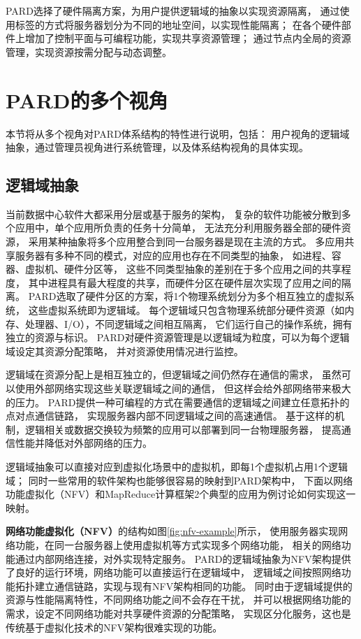 PARD选择了硬件隔离方案，为用户提供逻辑域的抽象以实现资源隔离，
通过使用标签的方式将服务器划分为不同的地址空间，以实现性能隔离；
在各个硬件部件上增加了控制平面与可编程功能，实现共享资源管理；
通过节点内全局的资源管理，实现资源按需分配与动态调整。


\section{PARD的多个视角}

本节将从多个视角对PARD体系结构的特性进行说明，包括：
用户视角的逻辑域抽象，通过管理员视角进行系统管理，以及体系结构视角的具体实现。

\subsection{逻辑域抽象}

当前数据中心软件大都采用分层或基于服务的架构，
复杂的软件功能被分散到多个应用中，单个应用所负责的任务十分简单，
无法充分利用服务器全部的硬件资源，
采用某种抽象将多个应用整合到同一台服务器是现在主流的方式。
多应用共享服务器有多种不同的模式，对应的应用也存在不同类型的抽象，
如进程、容器、虚拟机、硬件分区\cite{LDom,IBM_LPAR:2007}等，
这些不同类型抽象的差别在于多个应用之间的共享程度，
其中进程具有最大程度的共享，而硬件分区在硬件层次实现了应用之间的隔离。
PARD选取了硬件分区的方案，将1个物理系统划分为多个相互独立的虚拟系统，
这些虚拟系统即为逻辑域。
每个逻辑域只包含物理系统部分硬件资源（如内存、处理器、I/O），不同逻辑域之间相互隔离，
它们运行自己的操作系统，拥有独立的资源与标识。
PARD对硬件资源管理是以逻辑域为粒度，可以为每个逻辑域设定其资源分配策略，
并对资源使用情况进行监控。

逻辑域在资源分配上是相互独立的，但逻辑域之间仍然存在通信的需求，
虽然可以使用外部网络实现这些关联逻辑域之间的通信，
但这样会给外部网络带来极大的压力。%
PARD提供一种可编程的方式在需要通信的逻辑域之间建立任意拓扑的点对点通信链路，
实现服务器内部不同逻辑域之间的高速通信。
基于这样的机制，逻辑相关或数据交换较为频繁的应用可以部署到同一台物理服务器，
提高通信性能并降低对外部网络的压力。

逻辑域抽象可以直接对应到虚拟化场景中的虚拟机，即每1个虚拟机占用1个逻辑域；
同时一些常用的软件架构也能够很容易的映射到PARD架构中，
下面以网络功能虚拟化（NFV）和MapReduce计算框架2个典型的应用为例讨论如何实现这一映射。

\textbf{网络功能虚拟化（NFV）}的结构如图\ref{fig:nfv-example}所示，
使用服务器实现网络功能，在同一台服务器上使用虚拟机等方式实现多个网络功能，
相关的网络功能通过内部网络连接，对外实现特定服务。
PARD的逻辑域抽象为NFV架构提供了良好的运行环境，网络功能可以直接运行在逻辑域中，
逻辑域之间按照网络功能拓扑建立通信链路，实现与现有NFV架构相同的功能。
同时由于逻辑域提供的资源与性能隔离特性，不同网络功能之间不会存在干扰，
并可以根据网络功能的需求，设定不同网络功能对共享硬件资源的分配策略，
实现区分化服务，这也是传统基于虚拟化技术的NFV架构很难实现的功能。

